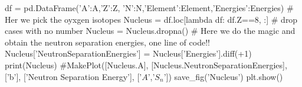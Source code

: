 \documentclass[%
oneside,                 %
final,                   %
10pt]{article}
\newenvironment{doconceexercise}{}{}
\begin{document}
\begin{doconceexercise}
df = pd.DataFrame({'A':A,'Z':Z, 'N':N,'Element':Element,'Energies':Energies})
# Her we pick the oyxgen isotopes
Nucleus = df.loc[lambda df: df.Z==8, :]
# drop cases with no number
Nucleus = Nucleus.dropna()
# Here we do the magic and obtain the neutron separation energies, one line of code!!
Nucleus['NeutronSeparationEnergies'] = Nucleus['Energies'].diff(+1)
print(Nucleus)
#MakePlot([Nucleus.A], [Nucleus.NeutronSeparationEnergies], ['b'], ['Neutron Separation Energy'], ['$A$','$S_n$'])
save_fig('Nucleus')
plt.show()

\epycod


\end{doconceexercise}



\end{document}
